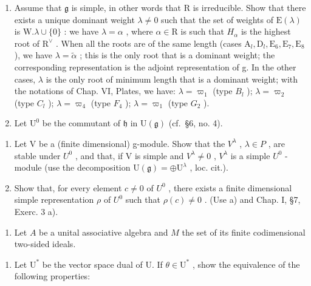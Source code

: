 \begin{enumerate}
\item
  Assume that \(\mathfrak{g}\) is simple, in other words that R is irreducible. Show that there exists a unique dominant weight \(\lambda \neq 0\) such that the set of weights of \(\mathrm{E}(\lambda)\) is \(\mathrm{W}.\lambda \cup \{0\}\) : we have \(\lambda = \alpha\) , where \(\alpha \in \mathrm{R}\) is such that \(H_{\alpha}\) is the highest root of \(\mathrm{R}^{\vee}\) . When all the roots are of the same length (cases \(\mathrm{A}_l,\mathrm{D}_l,\mathrm{E}_6,\mathrm{E}_7,\mathrm{E}_8\) ), we have \(\lambda = \tilde{\alpha}\) ; this is the only root that is a dominant weight; the corresponding representation is the adjoint representation of g. In the other cases, \(\lambda\) is the only root of minimum length that is a dominant weight; with the notations of Chap. VI, Plates, we have: \(\lambda = \varpi_{1}\) (type \(B_{l}\) ); \(\lambda = \varpi_{2}\) (type \(C_{l}\) ); \(\lambda = \varpi_{4}\) (type \(F_{4}\) ); \(\lambda = \varpi_{1}\) (type \(G_{2}\) ).
\item
  Let \(\mathrm{U}^0\) be the commutant of \(\mathfrak{h}\) in \(\mathrm{U}(\mathfrak{g})\) (cf.~§6, no. 4).
\end{enumerate}

\begin{enumerate}
\def\labelenumi{\alph{enumi})}
\item
  Let V be a (finite dimensional) g-module. Show that the \(V^{\lambda}\) , \(\lambda \in P\) , are stable under \(U^{0}\) , and that, if V is simple and \(V^{\lambda} \neq 0\) , \(V^{\lambda}\) is a simple \(U^{0}\) -module (use the decomposition \(\mathrm{U}(\mathfrak{g}) = \oplus\mathrm{U}^{\lambda}\) , loc. cit.).
\item
  Show that, for every element \(c \neq 0\) of \(U^{0}\) , there exists a finite dimensional simple representation \(\rho\) of \(U^{0}\) such that \(\rho(c) \neq 0\) . (Use a) and Chap. I, §7, Exerc. 3 a).
\end{enumerate}

\begin{enumerate}
\def\labelenumi{\arabic{enumi})}
\setcounter{enumi}{23}
\tightlist
\item
  Let \(A\) be a unital associative algebra and \(M\) the set of its finite codimensional two-sided ideals.
\end{enumerate}

\begin{enumerate}
\def\labelenumi{\alph{enumi})}
\tightlist
\item
  Let \(\mathrm{U}^*\) be the vector space dual of U. If \(\theta \in \mathrm{U}^*\) , show the equivalence of the following properties:
\end{enumerate}

